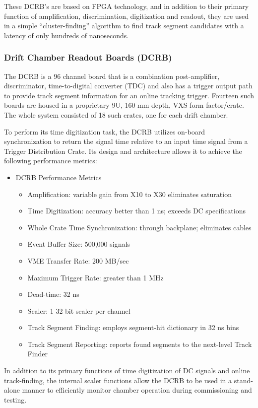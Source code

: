 These DCRB's are based on FPGA technology, and in addition to
their primary function of amplification, discrimination, digitization
and readout, they are used in a simple ``cluster-finding'' algorithm
to find track segment candidates with a latency of only hundreds
of nanoseconds.

\subsubsection{Drift Chamber Readout Boards (DCRB)}

The DCRB is a 96 channel board that is a combination post-amplifier,
discriminator, time-to-digital converter (TDC) and also has a trigger
output path to provide track segment information for an online tracking trigger.
Fourteen such boards are housed in
a proprietary 9U, 160 mm depth, VXS form factor/crate.
The whole system consisted of 18 such crates, one for each drift chamber.

To perform its time digitization task, the DCRB utilizes on-board synchronization to
return the signal time relative to an input time signal from  a Trigger Distribution
Crate.
Its design and architecture
allows it to achieve the following performance metrics:
\begin{itemize}
\item DCRB Performance Metrics
\begin{itemize}
\item Amplification: variable gain from X10 to X30 eliminates saturation
\item Time Digitization: accuracy better than 1 ns; exceeds DC specifications
\item Whole Crate Time Synchronization: through backplane; eliminates cables
\item Event Buffer Size: 500,000 signals
\item VME Transfer Rate: 200 MB/sec
\item Maximum Trigger Rate: greater than 1 MHz
\item Dead-time: 32 ns
\item Scaler: 1 32 bit scaler per channel
\item Track Segment Finding: employs segment-hit dictionary in 32 ns bins
\item Track Segment Reporting: reports found segments to the next-level Track Finder
\end{itemize}
\end{itemize}

In addition to its primary functions of time digitization of DC signals and online
track-finding, the internal scaler functions allow the DCRB to be used in 
a stand-alone manner to efficiently monitor chamber operation during commissioning
and testing.

